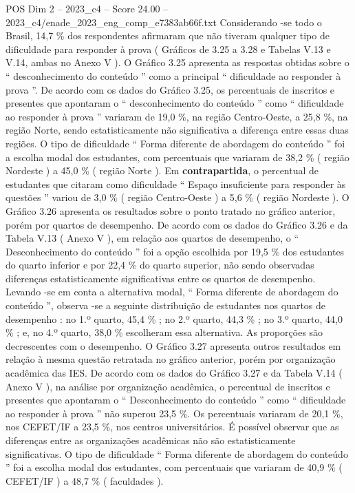 \begin{textsample}{POS Dim 2 – 2023\_c4 – Score 24.00 – 2023\_c4/enade\_2023\_eng\_comp\_e7383ab66f.txt}
Considerando -se todo o Brasil, 14,7 \% dos respondentes afirmaram que não tiveram qualquer tipo de dificuldade para responder à prova ( Gráficos de 3.25 a 3.28 e Tabelas V.13 e V.14, ambas no Anexo V ).
O Gráfico 3.25 apresenta as respostas obtidas sobre o “ desconhecimento do conteúdo ” como a principal “ dificuldade ao responder à prova ”.
De acordo com os dados do Gráfico 3.25, os percentuais de inscritos e presentes que apontaram o “ desconhecimento do conteúdo ” como “ dificuldade ao responder à prova ” variaram de 19,0 \%, na região Centro-Oeste, a 25,8 \%, na região Norte, sendo estatisticamente não significativa a diferença entre essas duas regiões.
O tipo de dificuldade “ Forma diferente de abordagem do conteúdo ” foi a escolha modal dos estudantes, com percentuais que variaram de 38,2 \% ( região Nordeste ) a 45,0 \% ( região Norte ).
Em \textbf{contrapartida}, o percentual de estudantes que citaram como dificuldade “ Espaço insuficiente para responder às questões ” variou de 3,0 \% ( região Centro-Oeste ) a 5,6 \% ( região Nordeste ).
O Gráfico 3.26 apresenta os resultados sobre o ponto tratado no gráfico anterior, porém por quartos de desempenho.
De acordo com os dados do Gráfico 3.26 e da Tabela V.13 ( Anexo V ), em relação aos quartos de desempenho, o “ Desconhecimento do conteúdo ” foi a opção escolhida por 19,5 \% dos estudantes do quarto inferior e por 22,4 \% do quarto superior, não sendo observadas diferenças estatisticamente significativas entre os quartos de desempenho.
Levando -se em conta a alternativa modal, “ Forma diferente de abordagem do conteúdo ”, observa -se a seguinte distribuição de estudantes nos quartos de desempenho : no 1.º quarto, 45,4 \% ; no 2.º quarto, 44,3 \% ; no 3.º quarto, 44,0 \% ; e, no 4.º quarto, 38,0 \% escolheram essa alternativa.
As proporções são decrescentes com o desempenho.
O Gráfico 3.27 apresenta outros resultados em relação à mesma questão retratada no gráfico anterior, porém por organização acadêmica das IES.
De acordo com os dados do Gráfico 3.27 e da Tabela V.14 ( Anexo V ), na análise por organização acadêmica, o percentual de inscritos e presentes que apontaram o “ Desconhecimento do conteúdo ” como “ dificuldade ao responder à prova ” não superou 23,5 \%.
Os percentuais variaram de 20,1 \%, nos CEFET/IF a 23,5 \%, nos centros universitários.
É possível observar que as diferenças entre as organizações acadêmicas não são estatisticamente significativas.
O tipo de dificuldade “ Forma diferente de abordagem do conteúdo ” foi a escolha modal dos estudantes, com percentuais que variaram de 40,9 \% ( CEFET/IF ) a 48,7 \% ( faculdades ).

\end{textsample}

